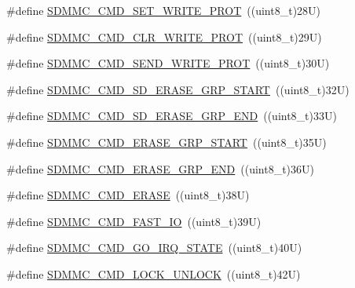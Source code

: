 \begin{DoxyCompactItemize}
\#define \mbox{\hyperlink{group___s_d_m_m_c___l_l___exported___constants_ga1059b12d2471f87ea09fd204ecb6345c}{S\+D\+M\+M\+C\+\_\+\+C\+M\+D\+\_\+\+S\+E\+T\+\_\+\+W\+R\+I\+T\+E\+\_\+\+P\+R\+OT}}~((uint8\+\_\+t)28\+U)
\item 
\#define \mbox{\hyperlink{group___s_d_m_m_c___l_l___exported___constants_gae73e139ab789bd8d2eac5de4268c4880}{S\+D\+M\+M\+C\+\_\+\+C\+M\+D\+\_\+\+C\+L\+R\+\_\+\+W\+R\+I\+T\+E\+\_\+\+P\+R\+OT}}~((uint8\+\_\+t)29\+U)
\item 
\#define \mbox{\hyperlink{group___s_d_m_m_c___l_l___exported___constants_ga25de629041f746c9ebe0d7334a8977c9}{S\+D\+M\+M\+C\+\_\+\+C\+M\+D\+\_\+\+S\+E\+N\+D\+\_\+\+W\+R\+I\+T\+E\+\_\+\+P\+R\+OT}}~((uint8\+\_\+t)30\+U)
\item 
\#define \mbox{\hyperlink{group___s_d_m_m_c___l_l___exported___constants_ga855b317549bcdb3190a043c6e4466fbe}{S\+D\+M\+M\+C\+\_\+\+C\+M\+D\+\_\+\+S\+D\+\_\+\+E\+R\+A\+S\+E\+\_\+\+G\+R\+P\+\_\+\+S\+T\+A\+RT}}~((uint8\+\_\+t)32\+U)
\item 
\#define \mbox{\hyperlink{group___s_d_m_m_c___l_l___exported___constants_gacab5b851a199fb6f1ce25c0f2a9bf58c}{S\+D\+M\+M\+C\+\_\+\+C\+M\+D\+\_\+\+S\+D\+\_\+\+E\+R\+A\+S\+E\+\_\+\+G\+R\+P\+\_\+\+E\+ND}}~((uint8\+\_\+t)33\+U)
\item 
\#define \mbox{\hyperlink{group___s_d_m_m_c___l_l___exported___constants_ga222af543d8788429733558bf5c97ad48}{S\+D\+M\+M\+C\+\_\+\+C\+M\+D\+\_\+\+E\+R\+A\+S\+E\+\_\+\+G\+R\+P\+\_\+\+S\+T\+A\+RT}}~((uint8\+\_\+t)35\+U)
\item 
\#define \mbox{\hyperlink{group___s_d_m_m_c___l_l___exported___constants_ga3bfd8511b947d38397a8a63fcd041d48}{S\+D\+M\+M\+C\+\_\+\+C\+M\+D\+\_\+\+E\+R\+A\+S\+E\+\_\+\+G\+R\+P\+\_\+\+E\+ND}}~((uint8\+\_\+t)36\+U)
\item 
\#define \mbox{\hyperlink{group___s_d_m_m_c___l_l___exported___constants_gacbce0e54d0b9b626215502f9311c8355}{S\+D\+M\+M\+C\+\_\+\+C\+M\+D\+\_\+\+E\+R\+A\+SE}}~((uint8\+\_\+t)38\+U)
\item 
\#define \mbox{\hyperlink{group___s_d_m_m_c___l_l___exported___constants_ga27f4c8061e08bc26399e2643ac4af8bf}{S\+D\+M\+M\+C\+\_\+\+C\+M\+D\+\_\+\+F\+A\+S\+T\+\_\+\+IO}}~((uint8\+\_\+t)39\+U)
\item 
\#define \mbox{\hyperlink{group___s_d_m_m_c___l_l___exported___constants_ga2966ee709302ab6d6511ea65773e9c6e}{S\+D\+M\+M\+C\+\_\+\+C\+M\+D\+\_\+\+G\+O\+\_\+\+I\+R\+Q\+\_\+\+S\+T\+A\+TE}}~((uint8\+\_\+t)40\+U)
\item 
\#define \mbox{\hyperlink{group___s_d_m_m_c___l_l___exported___constants_ga5fcd125fdb62cb169e3fa7b27db07115}{S\+D\+M\+M\+C\+\_\+\+C\+M\+D\+\_\+\+L\+O\+C\+K\+\_\+\+U\+N\+L\+O\+CK}}~((uint8\+\_\+t)42\+U)

\end{DoxyCompactItemize}
